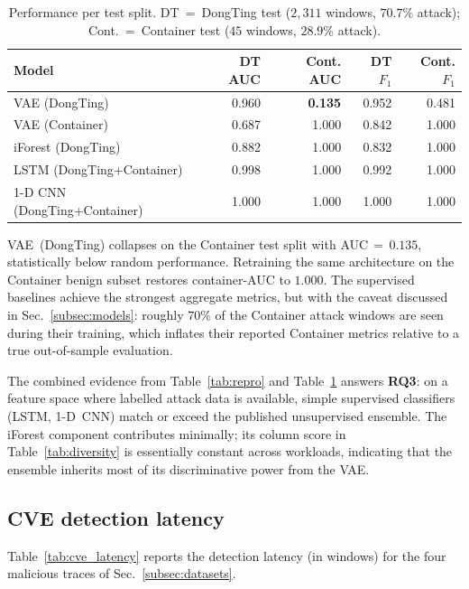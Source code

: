 \begin{table}[!t]
\centering
\caption{Performance per test split. DT~=~DongTing test
($2{,}311$ windows, $70.7\%$ attack); Cont.~=~Container test
($45$ windows, $28.9\%$ attack).}
\label{tab:v2_models}
\begin{tabular}{lrrrr}
\toprule
Model                          & DT AUC & Cont. AUC & DT $F_{1}$ & Cont. $F_{1}$ \\
\midrule
VAE (DongTing)                 & 0.960  & \textbf{0.135} & 0.952 & 0.481 \\
VAE (Container)                & 0.687  & 1.000          & 0.842 & 1.000 \\
iForest (DongTing)             & 0.882  & 1.000          & 0.832 & 1.000 \\
LSTM (DongTing+Container)      & 0.998  & 1.000          & 0.992 & 1.000 \\
1-D CNN (DongTing+Container)   & 1.000  & 1.000          & 1.000 & 1.000 \\
\bottomrule
\end{tabular}
\end{table}

VAE~(DongTing) collapses on the Container test split with
AUC$\,=\,0.135$, statistically below random performance. Retraining
the same architecture on the Container benign subset restores
container-AUC to $1.000$. The supervised baselines achieve the
strongest aggregate metrics, but with the caveat discussed in
Sec.~\ref{subsec:models}: roughly $70\%$ of the Container attack
windows are seen during their training, which inflates their reported
Container metrics relative to a true out-of-sample evaluation.

The combined evidence from Table~\ref{tab:repro} and
Table~\ref{tab:v2_models} answers \textbf{RQ3}: on a feature space
where labelled attack data is available, simple supervised classifiers
(LSTM, 1-D~CNN) match or exceed the published unsupervised ensemble.
The iForest component contributes minimally; its column score in
Table~\ref{tab:diversity} is essentially constant across workloads,
indicating that the ensemble inherits most of its discriminative
power from the VAE.

\subsection{CVE detection latency}
\label{subsec:cve_latency}
Table~\ref{tab:cve_latency} reports the detection latency (in
windows) for the four malicious traces of
Sec.~\ref{subsec:datasets}.

